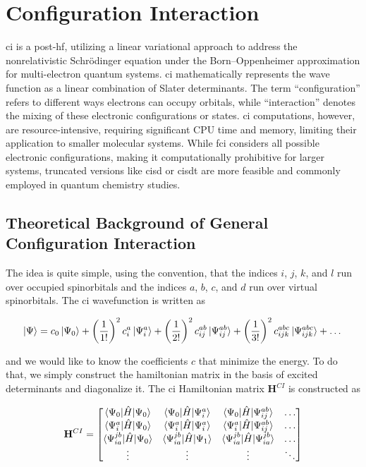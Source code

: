 \chapter{Configuration Interaction}

\acrfull{ci} is a \acrshort{post-hf}, utilizing a linear variational approach to address the nonrelativistic Schrödinger equation under the Born--Oppenheimer approximation for multi-electron quantum systems. \acrshort{ci} mathematically represents the wave function as a linear combination of Slater determinants. The term ``configuration'' refers to different ways electrons can occupy orbitals, while ``interaction'' denotes the mixing of these electronic configurations or states. \acrshort{ci} computations, however, are resource-intensive, requiring significant CPU time and memory, limiting their application to smaller molecular systems. While \acrfull{fci} considers all possible electronic configurations, making it computationally prohibitive for larger systems, truncated versions like \acrfull{cisd} or \acrfull{cisdt} are more feasible and commonly employed in quantum chemistry studies.

\section{Theoretical Background of General Configuration Interaction}

The idea is quite simple, using the convention, that the indices \(i\), \(j\), \(k\), and \(l\) run over occupied spinorbitals and the indices \(a\), \(b\), \(c\), and \(d\) run over virtual spinorbitals. The \acrshort{ci} wavefunction is written as

\begin{equation}
\ket{\Psi}=c_0\ket{\Psi_0}+\left(\frac{1}{1!}\right)^2c_i^a\ket{\Psi_i^a}+\left(\frac{1}{2!}\right)^2c_{ij}^{ab}\ket{\Psi_{ij}^{ab}}+\left(\frac{1}{3!}\right)^2c_{ijk}^{abc}\ket{\Psi_{ijk}^{abc}}+\dots
\end{equation}

and we would like to know the coefficients \(c\) that minimize the energy. To do that, we simply construct the hamiltonian matrix in the basis of excited determinants and diagonalize it. The \acrshort{ci} Hamiltonian matrix \(\mathbf{H}^{CI}\) is constructed as

\begin{equation}\label{eq:ci-hamiltonian}
\mathbf{H}^{CI}=
\begin{bmatrix}
\braket{\Psi_0|\hat{H}|\Psi_0} & \braket{\Psi_0|\hat{H}|\Psi_i^a} & \braket{\Psi_0|\hat{H}|\Psi_{ij}^{ab}} & \dots \\
\braket{\Psi_i^a|\hat{H}|\Psi_0} & \braket{\Psi_i^a|\hat{H}|\Psi_i^a} & \braket{\Psi_i^a|\hat{H}|\Psi_{ij}^{ab}} & \dots \\
\braket{\Psi_{ia}^{jb}|\hat{H}|\Psi_0} & \braket{\Psi_{ia}^{jb}|\hat{H}|\Psi_1} & \braket{\Psi_{ia}^{jb}|\hat{H}|\Psi_{ia}^{jb}} & \dots \\
\vdots & \vdots & \vdots & \ddots
\end{bmatrix}
\end{equation}

